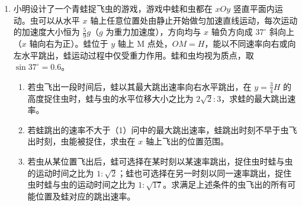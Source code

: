 \documentclass[\gkver]{gaokaozhenti}
\begin{document}
\begin{enumerate}
{\begin{enumerate}
	\item
	$P = \frac{B_{0}^{2}L^{3}S}{16\pi^{2}\rho(\Delta t)^{2}}$

\end{enumerate}
}

\item
小明设计了一个青蛙捉飞虫的游戏，游戏中蛙和虫都在 $xOy$ 竖直平面内运动。虫可以从水平 $x$ 轴上任意位置处由静止开始做匀加速直线运动，每次运动的加速度大小恒为 $\frac{5}{9}g$（$g$ 为重力加速度），方向均与 $x$ 轴负方向成 $37^\circ$ 斜向上（$x$ 轴向右为正）。蛙位于 $y$ 轴上 M 点处，$OM = H$，能以不同速率向右或向左水平跳出，蛙运动过程中仅受重力作用。蛙和虫均视为质点，取 $\sin 37^\circ = 0.6$。
\begin{enumerate}
	\item
	若虫飞出一段时间后，蛙以其最大跳出速率向右水平跳出，在 $y = \frac{3}{4}H$ 的高度捉住虫时，蛙与虫的水平位移大小之比为 $2\sqrt 2:3$，求蛙的最大跳出速率。
	\item
	若蛙跳出的速率不大于（1）问中的最大跳出速率，蛙跳出时刻不早于虫飞出时刻，虫能被捉住，求虫在 $x$ 轴上飞出的位置范围。
	\item
	若虫从某位置飞出后，蛙可选择在某时刻以某速率跳出，捉住虫时蛙与虫的运动时间之比为 $1:\sqrt 2$；蛙也可选择在另一时刻以同一速率跳出，捉住虫时蛙与虫的运动时间之比为 $1:\sqrt{17}$。求满足上述条件的虫飞出的所有可能位置及蛙对应的跳出速率。
\end{enumerate}

\end{enumerate}
\end{document}
